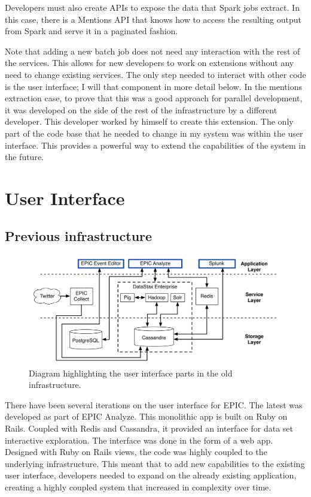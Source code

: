 Developers must also create APIs to expose the data that Spark jobs extract. In this case, there is a Mentions API that knows how to access the resulting output from Spark and serve it in a paginated fashion. 

Note that adding a new batch job does not need any interaction with the rest of the services. This allows for new developers to work on extensions without any need to change existing services. The only step needed to interact with other code is the user interface; I will that component in more detail below. In the mentions extraction case, to prove that this was a good approach for parallel development, it was developed on the side of the rest of the infrastructure by a different developer. This developer worked by himself to create this extension. The only part of the code base that he needed to change in my system was within the user interface. This provides a powerful way to extend the capabilities of the system in the future.

\section{User Interface}

\subsection{Previous infrastructure}

\begin{figure}[htbp]
	\caption{\label{fig:oldinfrui}
	Diagram highlighting the user interface parts in the old infrastructure.
	}
    \begin{center}
	\includegraphics[width=150mm]{figs/old-arch-ui.png}
    \end{center}
\label{xfigDiagram}
\end{figure}

There have been several iterations on the user interface for EPIC. The latest was developed as part of EPIC Analyze. This monolithic app is built on Ruby on Rails. Coupled with Redis and Cassandra, it provided an interface for data set interactive exploration. The interface was done in the form of a web app. Designed with Ruby on Rails views, the code was highly coupled to the underlying infrastructure. This meant that to add new capabilities to the existing user interface, developers needed to expand on the already existing application, creating a highly coupled system that increased in complexity over time. 


